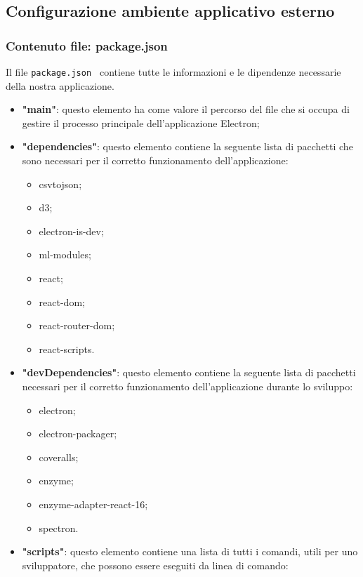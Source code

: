 \subsection{Configurazione ambiente applicativo esterno}
\subsubsection{Contenuto file: package.json}%
Il file \verb|package.json | contiene tutte le informazioni e le dipendenze necessarie della nostra applicazione.
\begin{itemize}
    \item \textbf{"main"}: questo elemento ha come valore il percorso del file che si occupa di gestire il processo principale dell'applicazione Electron;
    \item \textbf{"dependencies"}: questo elemento contiene la seguente lista di pacchetti che sono necessari per il corretto funzionamento dell'applicazione:
        \begin{itemize}
            \item csvtojson;
            \item d3;
            \item electron-is-dev;
            \item ml-modules;
            \item react;
            \item react-dom;
            \item react-router-dom;
            \item react-scripts.
        \end{itemize}
    \item \textbf{"devDependencies"}: questo elemento contiene la seguente lista di pacchetti necessari per il corretto funzionamento dell'applicazione durante lo sviluppo:
        \begin{itemize}
            \item electron;
            \item electron-packager;
            \item coveralls;
            \item enzyme;
            \item enzyme-adapter-react-16;
            \item spectron.
        \end{itemize} 
    \item \textbf{"scripts"}: questo elemento contiene una lista di tutti i comandi, utili per uno sviluppatore, che possono essere eseguiti da linea di comando:

\end{itemize}
